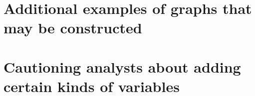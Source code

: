\section{Additional examples of graphs that may be constructed}
\figureComplexModeratesGraphIR
\figureOnlyAssociatesOrCausesEdgesCandidateMainEffects


\section{Cautioning analysts about adding certain kinds of variables}
\figurePossibleConfoundingAssociation
